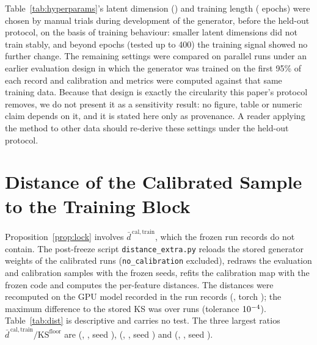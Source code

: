 \documentclass[preprint,12pt]{elsarticle}
\begin{document}
Table~\ref{tab:hyperparams}'s latent dimension (\protoLatent{}) and training
length (\protoEpochs{} epochs) were chosen by manual trials during development
of the generator, before the held-out protocol, on the basis of training
behaviour: smaller latent dimensions did not train stably, and beyond
\protoEpochs{} epochs (tested up to 400) the training signal showed no further
change. The remaining settings were compared on parallel runs under an
earlier evaluation design in which the generator was trained on the first
95\% of each record and calibration and metrics were computed against that
same training data. Because that design is exactly the circularity this
paper's protocol removes, we do not present it as a sensitivity result: no
figure, table or numeric claim depends on it, and it is stated here only as
provenance. A reader applying the method to other data should re-derive
these settings under the held-out protocol.

\section{Distance of the Calibrated Sample to the Training Block}
\label{app:distance}

Proposition~\ref{prop:lock} involves $\bar d^{\,\mathrm{cal,train}}$, which
the frozen run records do not contain.  The post-freeze script
\texttt{distance\_extra.py} reloads the stored generator weights of the
\phDistNRuns{} calibrated runs (\texttt{no\_calibration} excluded), redraws the
evaluation and calibration samples with the frozen seeds, refits the
calibration map with the frozen code and computes the per-feature distances.
The distances were recomputed on the GPU model recorded in the run records
(\phDistDevice{}, torch \phDistTorch{}); the maximum difference to the stored
KS was \phDistGateMaxDiff{} over \phDistNRuns{} runs (tolerance
$10^{-4}$).  Table~\ref{tab:dist} is descriptive and carries no test.
The three largest ratios $\bar d^{\,\mathrm{cal,train}}/\mathrm{KS}^{\mathrm{floor}}$
are \phDistTopOneRatio{} (\phDistTopOneLoc{}, \phDistTopOneModel{}, seed
\phDistTopOneSeed{}), \phDistTopTwoRatio{} (\phDistTopTwoLoc{},
\phDistTopTwoModel{}, seed \phDistTopTwoSeed{}) and \phDistTopThreeRatio{}
(\phDistTopThreeLoc{}, \phDistTopThreeModel{}, seed \phDistTopThreeSeed{}).


\FloatBarrier

\end{document}
